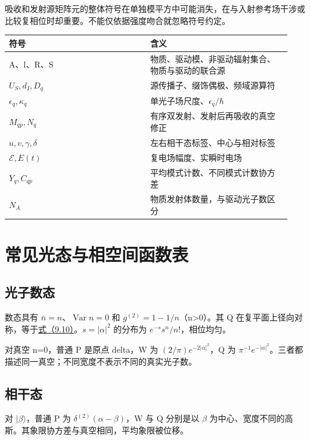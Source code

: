\documentclass[UTF8,a4paper,zihao=-4,openany,fontset=fandol]{ctexbook}
\begin{document}
吸收和发射源矩阵元的整体符号在单独模平方中可能消失，在与入射参考场干涉或比较复相位时却重要。不能仅依据强度吻合就忽略符号约定。



{\small\setlength{\tabcolsep}{3pt}
\begin{longtable}{@{}p{0.4700\linewidth} p{0.4700\linewidth}@{}}
\toprule
符号 & 含义 \\
\midrule\endhead
A、l、R、S & 物质、驱动模、非驱动辐射集合、物质与驱动的联合源 \\
$U_S,d_I,D_q$ & 源传播子、缀饰偶极、频域源算符 \\
$\epsilon_q,\kappa_q$ & 单光子场尺度、$\epsilon_q/\hbar$ \\
$M_{qp},N_q$ & 有序双发射、发射后再吸收的真空修正 \\
$u,v,\gamma,\delta$ & 左右相干态标签、中心与相对标签 \\
$\mathcal E,E(t)$ & 复电场幅度、实瞬时电场 \\
$Y_q,C_{qp}$ & 平均模式计数、不同模式计数协方差 \\
$N_A$ & 物质发射体数量，与驱动光子数区分 \\
\bottomrule
\end{longtable}}


\chapter{常见光态与相空间函数表}\label{ch:D}


\section{光子数态}\label{sec:D:1}


数态具有 $\bar n=n$、$\operatorname{Var}n=0$ 和 $g^{(2)}=1-1/n$（n>0）。其 Q 在复平面上径向对称，等于\hyperref[eq:9.10]{式（9.10）}。$s=|\alpha|^2$ 的分布为 $e^{-s}s^n/n!$，相位均匀。



对真空 n=0，普通 P 是原点 delta，W 为 $(2/\pi)e^{-2|\alpha|^2}$，Q 为 $\pi^{-1}e^{-|\alpha|^2}$。三者都描述同一真空；不同宽度不表示不同的真实光子数。



\section{相干态}\label{sec:D:2}


对 $|\beta\rangle$，普通 P 为 $\delta^{(2)}(\alpha-\beta)$，W 与 Q 分别是以 $\beta$ 为中心、宽度不同的高斯。其象限协方差与真空相同，平均象限被位移。
\end{document}
